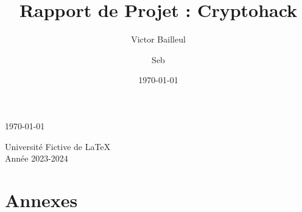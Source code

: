 \documentclass[12pt, a4paper]{article}
\title{Rapport de Projet : Cryptohack}
\author{Victor Bailleul \and Seb}
\date{\today}
\begin{document}
\begin{titlepage}
    \centering %

    \vspace*{1cm} %
    \begin{figure}[h!]
        \centering
        
    \end{figure}
    \vspace{2cm} %

    {\Huge\bfseries \thetitle\par}
    \vspace{1.5cm} %

    {\Large \theauthor\par}
    \vspace{1cm} %

    {\large \today\par}

    \vfill %

    {\large Université Fictive de LaTeX\\ Année 2023-2024\par}
    \vspace{1cm} %

\end{titlepage}


    \setcounter{page}{1}  %

    \tableofcontents %

    \clearpage

    
    
    
    
    
    

    \appendix
    \newpage
    \section*{Annexes}

    
\end{document}
